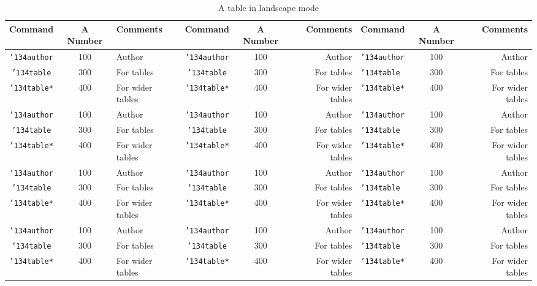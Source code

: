 \begin{pdflandscape}
	\begin{table}[h]
		\caption{A table in landscape mode}
		\label{tab:landscape}
		\begin{tabular}{cclccrlcr}
			\toprule
			Command                    & A Number & Comments         & Command                    & A Number & Comments         & Command                    & A Number & Comments         \\
			\midrule
			\texttt{{\char'134}author} & 100      & Author           & \texttt{{\char'134}author} & 100      & Author           & \texttt{{\char'134}author} & 100      & Author           \\
			\texttt{{\char'134}table}  & 300      & For tables       & \texttt{{\char'134}table}  & 300      & For tables       & \texttt{{\char'134}table}  & 300      & For tables       \\
			\texttt{{\char'134}table*} & 400      & For wider tables & \texttt{{\char'134}table*} & 400      & For wider tables & \texttt{{\char'134}table*} & 400      & For wider tables \\
			\texttt{{\char'134}author} & 100      & Author           & \texttt{{\char'134}author} & 100      & Author           & \texttt{{\char'134}author} & 100      & Author           \\
			\texttt{{\char'134}table}  & 300      & For tables       & \texttt{{\char'134}table}  & 300      & For tables       & \texttt{{\char'134}table}  & 300      & For tables       \\
			\texttt{{\char'134}table*} & 400      & For wider tables & \texttt{{\char'134}table*} & 400      & For wider tables & \texttt{{\char'134}table*} & 400      & For wider tables \\
			\texttt{{\char'134}author} & 100      & Author           & \texttt{{\char'134}author} & 100      & Author           & \texttt{{\char'134}author} & 100      & Author           \\
			\texttt{{\char'134}table}  & 300      & For tables       & \texttt{{\char'134}table}  & 300      & For tables       & \texttt{{\char'134}table}  & 300      & For tables       \\
			\texttt{{\char'134}table*} & 400      & For wider tables & \texttt{{\char'134}table*} & 400      & For wider tables & \texttt{{\char'134}table*} & 400      & For wider tables \\
			\texttt{{\char'134}author} & 100      & Author           & \texttt{{\char'134}author} & 100      & Author           & \texttt{{\char'134}author} & 100      & Author           \\
			\texttt{{\char'134}table}  & 300      & For tables       & \texttt{{\char'134}table}  & 300      & For tables       & \texttt{{\char'134}table}  & 300      & For tables       \\
			\texttt{{\char'134}table*} & 400      & For wider tables & \texttt{{\char'134}table*} & 400      & For wider tables & \texttt{{\char'134}table*} & 400      & For wider tables \\
			\bottomrule
		\end{tabular}
	\end{table}
\end{pdflandscape}
